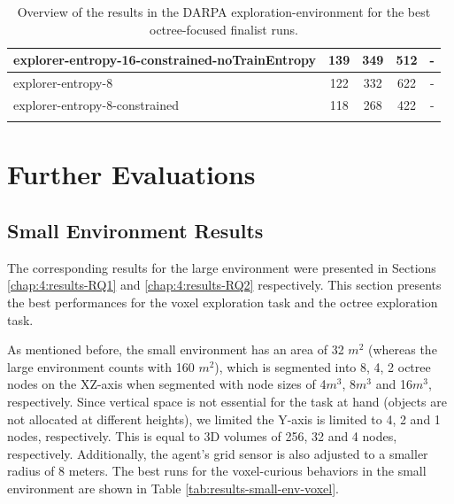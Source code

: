 \begin{longtable}{|l|c|c|c|c|}
explorer-entropy-16-constrained-noTrainEntropy & {\cellcolor[HTML]{55AA99}} \color[HTML]{000000} 139 & {\cellcolor[HTML]{8CC5B9}} \color[HTML]{000000} 349 & {\cellcolor[HTML]{AAD3CA}} \color[HTML]{000000} 512 &    -     \\ \hline
explorer-entropy-8 & {\cellcolor[HTML]{55AA99}} \color[HTML]{000000} 122 & {\cellcolor[HTML]{88C2B6}} \color[HTML]{000000} 332 & {\cellcolor[HTML]{C3DFD9}} \color[HTML]{000000} 622 &    -     \\ \hline
explorer-entropy-8-constrained & {\cellcolor[HTML]{55AA99}} \color[HTML]{000000} 118 & {\cellcolor[HTML]{76BAAC}} \color[HTML]{000000} 268 & {\cellcolor[HTML]{95C9BE}} \color[HTML]{000000} 422 &    -     \\ \hline

    \caption{Overview of the results in the DARPA exploration-environment for the best octree-focused finalist runs.}
    \label{tab:results-evaluation-framework}
\end{longtable}



\newpage
\section{Further Evaluations}\label{chap:4:further_evaluations} 
\subsection{Small Environment Results}\label{chap-4:small-env-results}
The corresponding results for the large environment were presented in Sections \ref{chap:4:results-RQ1} and \ref{chap:4:results-RQ2} respectively. 
This section presents the best performances for the voxel exploration task and the octree exploration task. 

As mentioned before, the small environment has an area of 32 $m^2$ (whereas the large environment counts with 160 $m^2$), which is segmented into 8, 4, 2 octree nodes on the XZ-axis when segmented with node sizes of 4$m^3$, 8$m^3$ and 16$m^3$, respectively.
Since vertical space is not essential for the task at hand (objects are not allocated at different heights), we limited the Y-axis is limited to 4, 2 and 1 nodes, respectively. 
This is equal to 3D volumes of 256, 32 and 4 nodes, respectively. 
Additionally, the agent’s grid sensor is also adjusted to a smaller radius of 8 meters.
The best runs for the voxel-curious behaviors in the small environment are shown in Table \ref{tab:results-small-env-voxel}.

